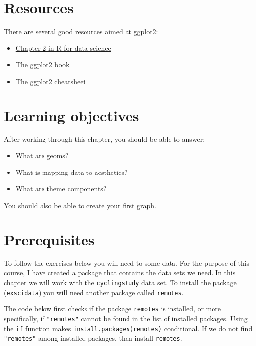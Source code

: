 \documentclass[
  11pt,
  letterpaper,
]{scrbook}
\providecommand{\tightlist}{%
  \setlength{\itemsep}{0pt}\setlength{\parskip}{0pt}}\usepackage{longtable,booktabs,array}
\begin{document}
\hypertarget{resources}{%
\section{Resources}\label{resources}}

There are several good resources aimed at ggplot2:

\begin{itemize}
\tightlist
\item
  \href{https://r4ds.hadley.nz/data-visualize}{Chapter 2 in R for data
  science}
\item
  \href{https://ggplot2-book.org/}{The ggplot2 book}
\item
  \href{https://github.com/rstudio/cheatsheets/raw/master/data-visualization-2.1.pdf}{The
  ggplot2 cheatsheet}
\end{itemize}

\hypertarget{learning-objectives}{%
\section{Learning objectives}\label{learning-objectives}}

After working through this chapter, you should be able to answer:

\begin{itemize}
\tightlist
\item
  What are geoms?
\item
  What is mapping data to aesthetics?
\item
  What are theme components?
\end{itemize}

You should also be able to create your first graph.

\hypertarget{prerequisites-1}{%
\section{Prerequisites}\label{prerequisites-1}}

To follow the exercises below you will need to some data. For the
purpose of this course, I have created a package that contains the data
sets we need. In this chapter we will work with the
\texttt{cyclingstudy} data set. To install the package
(\texttt{exscidata}) you will need another package called
\texttt{remotes}.

The code below first checks if the package \texttt{remotes} is
installed, or more specifically, if \texttt{"remotes"} cannot be found
in the list of installed packages. Using the \texttt{if} function makes
\texttt{install.packages(remotes)} conditional. If we do not find
\texttt{"remotes"} among installed packages, then install
\texttt{remotes}.
\end{document}
